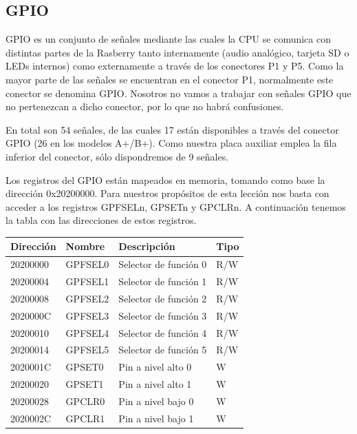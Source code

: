 \subsection{GPIO}

GPIO es un conjunto de señales mediante las cuales la CPU se comunica con distintas partes
de la Rasberry tanto internamente (audio analógico, tarjeta SD o LEDs internos) como
externamente a través de los conectores P1 y P5. Como la mayor parte de las señales se
encuentran en el conector P1, normalmente este conector se denomina GPIO. Nosotros
no vamos a trabajar con señales GPIO que no pertenezcan a dicho conector, por lo que no
habrá confusiones.

En total son 54 señales, de las cuales 17 están disponibles a través del conector
GPIO (26 en los modelos A+/B+). Como nuestra placa auxiliar emplea la fila inferior
del conector, sólo dispondremos de 9 señales.

Los registros del GPIO están mapeados en memoria, tomando como base la dirección 0x20200000.
Para nuestros propósitos de esta lección nos basta con acceder a los registros GPFSELn,
GPSETn y GPCLRn. A continuación tenemos la tabla con las direcciones de estos registros.

\begin{table}
\centering
\begin{tabular}{ p{1.8cm} | p{2cm} | p{5cm} | p{1cm} }
{\bf Dirección} & {\bf Nombre} & {\bf Descripción} & {\bf Tipo} \\
\hline
20200000 & GPFSEL0 & Selector de función 0 & R/W \\
20200004 & GPFSEL1 & Selector de función 1 & R/W \\
20200008 & GPFSEL2 & Selector de función 2 & R/W \\
2020000C & GPFSEL3 & Selector de función 3 & R/W \\
20200010 & GPFSEL4 & Selector de función 4 & R/W \\
20200014 & GPFSEL5 & Selector de función 5 & R/W \\
2020001C & GPSET0  & Pin a nivel alto 0 & W   \\
20200020 & GPSET1  & Pin a nivel alto 1 & W   \\
20200028 & GPCLR0  & Pin a nivel bajo 0 & W  \\
2020002C & GPCLR1  & Pin a nivel bajo 1 & W  \\
\end{tabular}
\end{table}



